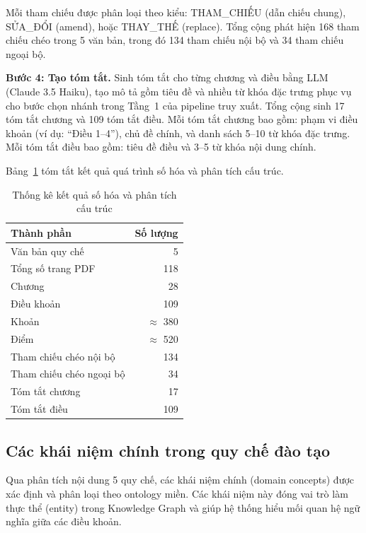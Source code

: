 Mỗi tham chiếu được phân loại theo kiểu: THAM\_CHIẾU (dẫn chiếu chung), SỬA\_ĐỔI
(amend), hoặc THAY\_THẾ (replace). Tổng cộng phát hiện 168 tham chiếu chéo trong 5
văn bản, trong đó 134 tham chiếu nội bộ và 34 tham chiếu ngoại bộ.

\textbf{Bước 4: Tạo tóm tắt.}
Sinh tóm tắt cho từng chương và điều bằng LLM (Claude 3.5 Haiku), tạo mô tả gồm
tiêu đề và nhiều từ khóa đặc trưng phục vụ cho bước chọn nhánh trong Tầng~1 của
pipeline truy xuất. Tổng cộng sinh 17 tóm tắt chương và 109 tóm tắt điều. Mỗi tóm
tắt chương bao gồm: phạm vi điều khoản (ví dụ: ``Điều 1--4''), chủ đề chính, và
danh sách 5--10 từ khóa đặc trưng. Mỗi tóm tắt điều bao gồm: tiêu đề điều và 3--5
từ khóa nội dung chính.

Bảng~\ref{tab:thongke_sohoa} tóm tắt kết quả quá trình số hóa và phân tích cấu
trúc.

\begin{table}[htbp]
    \centering
    \caption{Thống kê kết quả số hóa và phân tích cấu trúc}
    \label{tab:thongke_sohoa}
    \begin{tabular}{lr}
        \toprule
        \textbf{Thành phần} & \textbf{Số lượng} \\
        \midrule
        Văn bản quy chế       & 5 \\
        Tổng số trang PDF     & 118 \\
        Chương                & 28 \\
        Điều khoản            & 109 \\
        Khoản                 & $\approx$ 380 \\
        Điểm                  & $\approx$ 520 \\
        Tham chiếu chéo nội bộ & 134 \\
        Tham chiếu chéo ngoại bộ & 34 \\
        Tóm tắt chương        & 17 \\
        Tóm tắt điều          & 109 \\
        \bottomrule
    \end{tabular}
\end{table}

\subsection{Các khái niệm chính trong quy chế đào tạo}
\label{subsec:khainiemchinh}

Qua phân tích nội dung 5 quy chế, các khái niệm chính (domain concepts) được xác
định và phân loại theo ontology miền. Các khái niệm này đóng vai trò làm thực thể
(entity) trong Knowledge Graph và giúp hệ thống hiểu mối quan hệ ngữ nghĩa giữa
các điều khoản.


